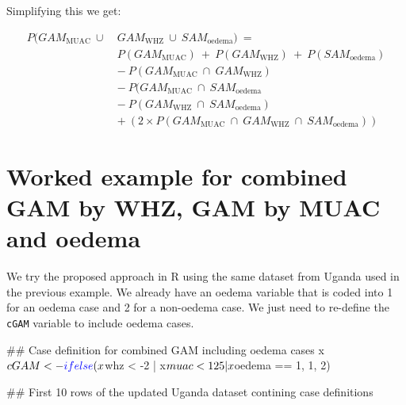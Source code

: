\documentclass[12pt,a4paper]{article}
\newenvironment{Shaded}{}{}
\newcommand{\CommentTok}[1]{\textcolor[rgb]{0.00,0.50,0.00}{#1}}
\newcommand{\DecValTok}[1]{#1}
\newcommand{\KeywordTok}[1]{\textcolor[rgb]{0.00,0.00,1.00}{#1}}
\newcommand{\NormalTok}[1]{#1}
\newcommand{\OperatorTok}[1]{#1}
\newcommand{\StringTok}[1]{\textcolor[rgb]{0.00,0.50,0.50}{#1}}
\begin{document}
Simplifying this we get:

\[\begin{aligned}
P(GAM_{\text{MUAC}} ~ \cup ~ & GAM_{\text{WHZ}} ~ \cup ~ SAM_{\text{oedema}}) ~ = \\
& P(GAM_{\text{MUAC}}) ~ + ~ P(GAM_{\text{WHZ}}) ~ + ~ P(SAM_\text{oedema}) \\ 
~ & - ~ P(GAM_{\text{MUAC}} ~ \cap ~ GAM_{\text{WHZ}}) \\
~ & - ~ P(GAM_{\text{MUAC}} ~ \cap ~ SAM_{\text{oedema}} \\
~ & - ~ P(GAM_{\text{WHZ}} ~ \cap ~ SAM_{\text{oedema}}) \\ 
~ & + ~ (2 \times P(GAM_{\text{MUAC}} ~ \cap ~ GAM_{\text{WHZ}} ~ \cap ~ SAM_{\text{oedema}}))
\end{aligned}\]

\hypertarget{worked-example-for-combined-gam-by-whz-gam-by-muac-and-oedema}{%
\section{Worked example for combined GAM by WHZ, GAM by MUAC and oedema}\label{worked-example-for-combined-gam-by-whz-gam-by-muac-and-oedema}}

We try the proposed approach in R using the same dataset from Uganda used in the previous example. We already have an oedema variable that is coded into 1 for an oedema case and 2 for a non-oedema case. We just need to re-define the \texttt{cGAM} variable to include oedema cases.

\newpage

\begin{Shaded}
\begin{Highlighting}[]
\CommentTok{## Case definition for combined GAM including oedema cases}
\NormalTok{x}\OperatorTok{$}\NormalTok{cGAM <-}\StringTok{ }\KeywordTok{ifelse}\NormalTok{(x}\OperatorTok{$}\NormalTok{whz }\OperatorTok{<}\StringTok{ }\DecValTok{-2} \OperatorTok{|}\StringTok{ }\NormalTok{x}\OperatorTok{$}\NormalTok{muac }\OperatorTok{<}\StringTok{ }\DecValTok{125} \OperatorTok{|}\StringTok{ }\NormalTok{x}\OperatorTok{$}\NormalTok{oedema }\OperatorTok{==}\StringTok{ }\DecValTok{1}\NormalTok{, }\DecValTok{1}\NormalTok{, }\DecValTok{2}\NormalTok{)}

\CommentTok{## First 10 rows of the updated Uganda dataset contining case definitions}
\end{Highlighting}
\end{Shaded}
\end{document}
